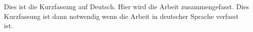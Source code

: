 Dies ist die Kurzfassung auf Deutsch. Hier wird die Arbeit zusammengefasst.
Dies Kurzfassung ist dann notwendig wenn die Arbeit in deutscher Sprache verfasst ist.

